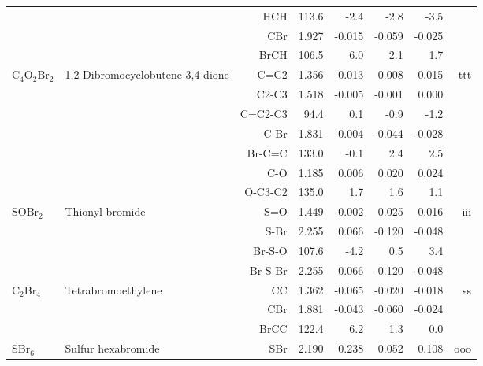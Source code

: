 \begin{table}
\begin{center}
\begin{tabular}{llrrrrrr}
             &                                    &HCH         &     113.6   &      -2.4 &      -2.8 &      -3.5   &       \\
             &                                    &CBr           &     1.927   &    -0.015 &    -0.059 &    -0.025 &       \\
             &                                    &BrCH        &     106.5   &       6.0 &       2.1 &       1.7   &       \\
 C$_4$O$_2$Br$_2$     & 1,2-Dibromocyclobutene-3,4-dione   &C=C2          &     1.356   &    -0.013 &     0.008 &     0.015 &   ttt \\
             &                                    &C2-C3         &     1.518   &    -0.005 &    -0.001 &     0.000 &       \\
             &                                    &C=C2-C3     &      94.4   &       0.1 &      -0.9 &      -1.2   &       \\
             &                                    &C-Br          &     1.831   &    -0.004 &    -0.044 &    -0.028 &       \\
             &                                    &Br-C=C      &     133.0   &      -0.1 &       2.4 &       2.5   &       \\
             &                                    &C-O           &     1.185   &     0.006 &     0.020 &     0.024 &       \\
             &                                    &O-C3-C2     &     135.0   &       1.7 &       1.6 &       1.1   &       \\
 SOBr$_2$       & Thionyl bromide                    &S=O           &     1.449   &    -0.002 &     0.025 &     0.016 &   iii \\
             &                                    &S-Br          &     2.255   &     0.066 &    -0.120 &    -0.048 &       \\
             &                                    &Br-S-O      &     107.6   &      -4.2 &       0.5 &       3.4   &       \\
             &                                    &Br-S-Br       &     2.255   &     0.066 &    -0.120 &    -0.048 &       \\
 C$_2$Br$_4$       & Tetrabromoethylene                 &CC            &     1.362   &    -0.065 &    -0.020 &    -0.018 &    ss \\
             &                                    &CBr           &     1.881   &    -0.043 &    -0.060 &    -0.024 &       \\
             &                                    &BrCC        &     122.4   &       6.2 &       1.3 &       0.0   &       \\
 SBr$_6$        & Sulfur hexabromide                 &SBr           &     2.190   &     0.238 &     0.052 &     0.108 &   ooo \\
\hline
\end{tabular}
\end{center}
\end{table}
\clearpage

